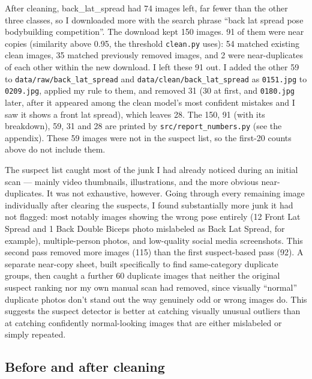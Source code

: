 \documentclass[11pt]{article}
\begin{document}
After cleaning, back\_lat\_spread had 74 images left, far fewer than the
other three classes, so I downloaded more with the search phrase ``back lat
spread pose bodybuilding competition''. The download kept 150 images. 91 of
them were near copies (similarity above 0.95, the threshold \texttt{clean.py}
uses): 54 matched existing clean images, 35 matched previously removed
images, and 2 were near-duplicates of each other within the new download. I
left these 91 out. I added the
other 59 to \texttt{data/raw/back\_lat\_spread} and
\texttt{data/clean/back\_lat\_spread} as \texttt{0151.jpg} to \texttt{0209.jpg},
applied my rule to them, and removed 31 (30 at first, and \texttt{0180.jpg} later,
after it appeared among the clean model's most confident mistakes and I saw it
shows a front lat spread), which leaves 28. The 150, 91 (with its breakdown), 59, 31 and 28 are printed by
\texttt{src/report\_numbers.py} (see the appendix). These 59 images were not in the suspect
list, so the first-20 counts above do not include them.

The suspect list caught most of the junk I had already noticed during an initial scan — mainly video thumbnails, illustrations, and the more obvious near-duplicates. It was not exhaustive, however. Going through every remaining image individually after clearing the suspects, I found substantially more junk it had not flagged: most notably images showing the wrong pose entirely (12 Front Lat Spread and 1 Back Double Biceps photo mislabeled as Back Lat Spread, for example), multiple-person photos, and low-quality social media screenshots. This second pass removed more images (115) than the first suspect-based pass (92). A separate near-copy sheet, built specifically to find same-category duplicate groups, then caught a further 60 duplicate images that neither the original suspect ranking nor my own manual scan had removed, since visually ``normal'' duplicate photos don't stand out the way genuinely odd or wrong images do. This suggests the suspect detector is better at catching visually unusual outliers than at catching confidently normal-looking images that are either mislabeled or simply repeated.

\subsection*{Before and after cleaning}


\begin{center}\end{center}
\end{document}
